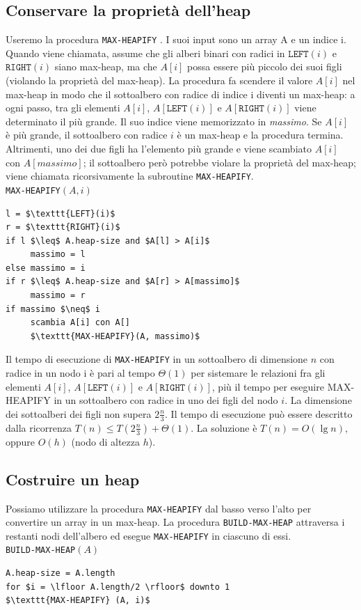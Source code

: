 \documentclass[11pt,a4paper]{article}
\begin{document}
\subsection{Conservare la proprietà dell’heap}
Useremo la procedura \texttt{MAX-HEAPIFY} . I suoi input sono un array A e un indice i.
Quando viene chiamata, assume che gli alberi binari con radici in $\texttt{LEFT}(i)$ e $\texttt{RIGHT}(i)$ siano max-heap, ma che
$A[i]$ possa essere più piccolo dei suoi figli (violando la proprietà del max-heap).
La procedura fa scendere il valore $A[i]$ nel max-heap in modo che il sottoalbero con radice di indice i diventi
un max-heap: a ogni passo, tra gli elementi $A[i]$, $A[\texttt{LEFT}(i)]$ e $A[\texttt{RIGHT}(i)]$ viene determinato il più grande. Il
suo indice viene memorizzato in \emph{massimo}. Se $A[i]$ è più grande, il sottoalbero con radice $i$ è un max-heap e la
procedura termina. Altrimenti, uno dei due figli ha l’elemento più grande e viene scambiato $A[i]$ con
$A[massimo]$; il sottoalbero però potrebbe violare la proprietà del max-heap; viene chiamata ricorsivamente la
subroutine \texttt{MAX-HEAPIFY}.\medskip\medskip\\
\texttt{MAX-HEAPIFY}$(A, i)$
\begin{lstlisting}[mathescape=true]
l = $\texttt{LEFT}(i)$
r = $\texttt{RIGHT}(i)$
if l $\leq$ A.heap-size and $A[l] > A[i]$
     massimo = l
else massimo = i
if r $\leq$ A.heap-size and $A[r] > A[massimo]$
     massimo = r
if massimo $\neq$ i
     scambia A[i] con A[]
     $\texttt{MAX-HEAPIFY}(A, massimo)$
\end{lstlisting}
Il tempo di esecuzione di \texttt{MAX-HEAPIFY} in un sottoalbero di dimensione $n$ con radice in un nodo i è pari al
tempo $\Theta(1)$ per sistemare le relazioni fra gli elementi $A[i]$, $A[ \texttt{LEFT} (i)]$ e $A[ \texttt{RIGHT} (i)]$, più il tempo per eseguire
MAX-HEAPIFY in un sottoalbero con radice in uno dei figli del nodo $i$.
La dimensione dei sottoalberi dei figli non supera $2\frac{n}{3}$.
Il tempo di esecuzione può essere descritto dalla ricorrenza $T(n) \leq T(2\frac{n}{3}) + \Theta(1)$. La soluzione è $T(n) = O(\lg n)$,
oppure $O(h)$ (nodo di altezza $h$).

\subsection{Costruire un heap}
Possiamo utilizzare la procedura \texttt{MAX-HEAPIFY} dal basso verso l’alto per convertire un array in un max-heap.
La procedura \texttt{BUILD-MAX-HEAP} attraversa i restanti nodi dell’albero ed esegue \texttt{MAX-HEAPIFY} in ciascuno di
essi.\medskip\medskip\\
\texttt{BUILD-MAX-HEAP}$(A)$
\begin{lstlisting}[mathescape=true]
A.heap-size = A.length
for $i = \lfloor A.length/2 \rfloor$ downto 1
$\texttt{MAX-HEAPIFY} (A, i)$
\end{lstlisting}
\end{document}
